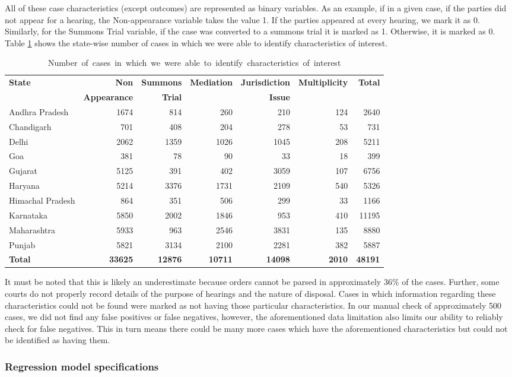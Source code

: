 All of these case characteristics (except outcomes) are represented as
binary variables. As an example, if in a given case, if the parties
did not appear for a hearing, the Non-appearance variable takes the
value 1. If the parties appeared at every hearing, we mark it as
0. Similarly, for the Summons Trial variable, if the case was
converted to a summons trial it is marked as 1. Otherwise, it is
marked as 0. Table \ref{tab:case_chars} shows the state-wise number of
cases in which we were able to identify characteristics of interest.

{\footnotesize \centering
  \begin{longtable}{@{}lrrrrrr@{}}
  \caption{\mbox{Number of cases in which we were able to identify
    characteristics of interest}}
  \label{tab:case_chars}\\
  \toprule
  \textbf{State} & \textbf{Non} & \textbf{Summons} & \textbf{Mediation} & \textbf{Jurisdiction} & \textbf{Multiplicity} & \textbf{Total} \\
   & \textbf{Appearance} & \textbf{Trial} & & \textbf{Issue} & & \\
  \midrule
  \endhead
  Andhra Pradesh & 1674 & 814 & 260 & 210 & 124 & 2640 \\
  Chandigarh & 701 & 408 & 204 & 278 & 53 & 731 \\
  Delhi & 2062 & 1359 & 1026 & 1045 & 208 & 5211 \\
  Goa & 381 & 78 & 90 & 33 & 18 & 399 \\
  Gujarat & 5125 & 391 & 402 & 3059 & 107 & 6756 \\
  Haryana & 5214 & 3376 & 1731 & 2109 & 540 & 5326 \\
  Himachal Pradesh & 864 & 351 & 506 & 299 & 33 & 1166 \\
  Karnataka & 5850 & 2002 & 1846 & 953 & 410 & 11195 \\
  Maharashtra & 5933 & 963 & 2546 & 3831 & 135 & 8880 \\
  Punjab & 5821 & 3134 & 2100 & 2281 & 382 & 5887 \\
  \midrule
  \textbf{Total} & \textbf{33625} & \textbf{12876} & \textbf{10711} &
  \textbf{14098} & \textbf{2010} & \textbf{48191}\\\bottomrule
\end{longtable}
}

It must be noted that this is likely an underestimate because orders cannot be parsed in approximately 36\% of the cases. Further, some courts do not properly record details of the purpose of hearings and the nature of disposal. Cases in which information regarding these characteristics could not be found were marked as not having those particular characteristics. In our manual check of approximately 500 cases, we did not find any false positives or false negatives, however, the aforementioned data limitation also limits our ability to reliably check for false negatives. This in turn means there could be many more cases which have the aforementioned characteristics but could not be identified as having them.

\subsubsection{Regression model specifications}
\label{sec:model-selection}


